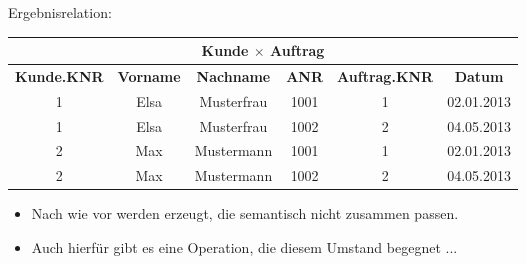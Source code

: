 \begin{frame}	\label{frame:kartesischesProduktMitUmbenennungErgebnis}
\frametitle{\insertsection}
\framesubtitle{\insertsubsection}
\abs
Ergebnisrelation:
\begin{center}
\begin{tabular}{|c|c|c|c|c|c|}\hline
	\multicolumn{6}{|c|}{\footnotesize \textbf{Kunde $\times$ Auftrag}}\\\hline\hline
	\cellcolor{Yellow}\footnotesize{\textbf{Kunde.KNR}} & \footnotesize{\textbf{Vorname}} & \footnotesize{\textbf{Nachname}} &\footnotesize{\textbf{ANR}} & \cellcolor{Yellow}\footnotesize{\textbf{Auftrag.KNR}}&\footnotesize{\textbf{Datum}}\\\hline
	1 & Elsa & Musterfrau & 1001  & 1 & 02.01.2013\\\hline
	\cellcolor{Red}1 & Elsa & Musterfrau & 1002 &\cellcolor{Red} 2& 04.05.2013\\\hline
	\cellcolor{Red}2 & Max & Mustermann & 1001  &\cellcolor{Red} 1& 02.01.2013\\\hline
	2 & Max & Mustermann & 1002  & 2& 04.05.2013\\\hline
\end{tabular}
\end{center}
\begin{itemize}
\item Nach wie vor werden  erzeugt, die semantisch nicht zusammen passen. 
\item Auch hierfür gibt es eine Operation, die diesem Umstand begegnet ...
\end{itemize}
\end{frame}

